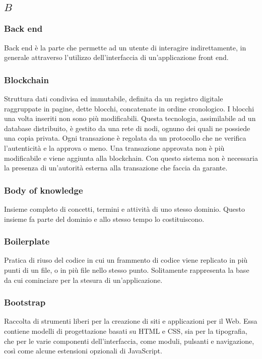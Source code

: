 \subsection*{\quad$B\quad$}
\subsubsection*{Back end}
Back end è la parte che permette ad un utente di interagire indirettamente, in generale attraverso l’utilizzo dell’interfaccia di un’applicazione front end.

\subsubsection*{Blockchain}
Struttura dati condivisa ed immutabile, definita da un registro digitale raggruppate in pagine, dette blocchi, concatenate in ordine cronologico. I blocchi una volta inseriti non sono più modificabili. Questa tecnologia, assimilabile ad un database distribuito, è gestito da una rete di nodi, ognuno dei quali ne possiede una copia privata. Ogni transazione è regolata da un protocollo che
ne verifica l’autenticità e la approva o meno. Una transazione approvata non è più modificabile e viene aggiunta alla blockchain. Con questo sistema non è necessaria la presenza di un’autorità esterna alla transazione che faccia da garante.

\subsubsection*{Body of knowledge}
Insieme completo di concetti, termini e attività di uno stesso dominio. Questo insieme fa parte del dominio e allo stesso tempo lo costituiscono.

\subsubsection*{Boilerplate}
Pratica di riuso del codice in cui un frammento di codice viene replicato in più punti di un file, o in più file nello stesso punto. Solitamente rappresenta la base da cui cominciare per la stesura di un'applicazione.

\subsubsection*{Bootstrap}
Raccolta di strumenti liberi per la creazione di siti e applicazioni per il Web. Essa contiene modelli di progettazione basati su HTML e CSS, sia per la tipografia, che per le varie componenti dell'interfaccia, come moduli, pulsanti e navigazione, così come alcune estensioni opzionali di JavaScript.
